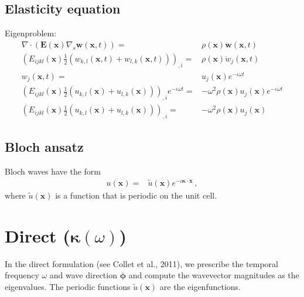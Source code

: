 \documentclass{article}
\newcommand{\imag}{\iota}
\newcommand{\vect}[1]{\boldsymbol{#1}}
\newcommand{\x}{x}
\newcommand{\vecx}{\vect{\x}}
\newcommand{\wavenum}{\kappa}
\newcommand{\wavevec}{\vect{\wavenum}}
\newcommand{\bloch}{e^{-\imag \wavevec \cdot \vecx}}
\newcommand{\kernel}[1]{\tilde{#1}}
\begin{document}
\subsection{Elasticity equation} \label{sec:prob.vector}

Eigenproblem:
%
\begin{align}
    \nabla \cdot \left(
        \boldsymbol{E}(\vecx) \nabla_s \vect{w}(\vecx, t)
    \right) =& \rho(\vecx) \ddot{\vect{w}}(\vecx, t) \nonumber \\
    \left(
        E_{ijkl}(\vecx) \frac{1}{2} \left(w_{k,l}(\vecx, t) + w_{l,k}(\vecx, t)\right)
    \right)_{,i} =& \rho(\vecx) \ddot{w}_j(\vecx, t) \nonumber \\
    w_j(\vecx, t) =& u_j(\vecx) e^{-\imag \omega t} \nonumber \\
    \left(
        E_{ijkl}(\vecx) \frac{1}{2} \left(u_{k,l}(\vecx) + u_{l,k}(\vecx)\right)
    \right)_{,i} e^{-\imag \omega t} =& -\omega^2 \rho(\vecx) u_j(\vecx) e^{
        -\imag \omega t
    } \nonumber \\
    \left(
        E_{ijkl}(\vecx) \frac{1}{2}\left(u_{k,l}(\vecx) + u_{l,k}(\vecx)\right)
    \right)_{,i} =& -\omega^2 \rho(\vecx) u_j(\vecx) \label{eq:prob.vector}
\end{align}


\subsection{Bloch ansatz} \label{sec:prob.bloch-ansatz}

Bloch waves have the form
%
\begin{align}
    u(\vecx) =& \kernel{u}(\vecx) \bloch \, , \label{eq:prob.bloch-ansatz}
\end{align}
%
where \(\kernel{u}(\vecx)\) is a function that is periodic on the unit cell.


\section{Direct ($\wavevec(\omega)$)} \label{sec:direct}

In the direct formulation (see Collet et al., 2011), we prescribe the temporal frequency \(\omega\) and wave direction \(\vect{\phi}\) and compute the wavevector magnitudes as the eigenvalues. The periodic functions \(\kernel{u}(\vecx)\) are the eigenfunctions.
\end{document}
